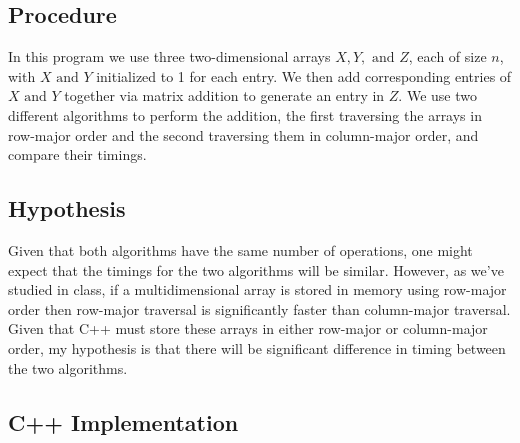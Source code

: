 \documentclass[11pt]{article}
\begin{document}
\subsection*{Procedure}

In this program we use three two-dimensional arrays $X, Y, \text{ and } Z$, each of size $n$, with $X \text{ and } Y$ initialized to 1 for each entry. We then add corresponding entries of $X \text{ and } Y$ together via matrix addition to generate an entry in $Z$. We use two different algorithms to perform the addition, the first traversing the arrays in row-major order and the second traversing them in column-major order, and compare their timings.

\subsection*{Hypothesis}

Given that both algorithms have the same number of operations, one might expect that the timings for the two algorithms will be similar. However, as we've studied in class, if a multidimensional array is stored in memory using row-major order then row-major traversal is significantly faster than column-major traversal. Given that C++ must store these arrays in either row-major or column-major order, my hypothesis is that there will be significant difference in timing between the two algorithms.

\subsection*{C++ Implementation}
\end{document}
